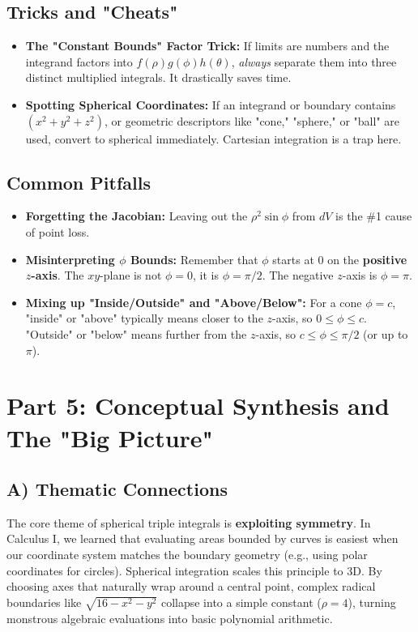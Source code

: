 \documentclass[12pt]{article}
\begin{document}
\subsection{Tricks and "Cheats"}
\begin{itemize}
    \item \textbf{The "Constant Bounds" Factor Trick:} If limits are numbers and the integrand factors into $f(\rho)g(\phi)h(\theta)$, \textit{always} separate them into three distinct multiplied integrals. It drastically saves time.
    \item \textbf{Spotting Spherical Coordinates:} If an integrand or boundary contains $(x^2+y^2+z^2)$, or geometric descriptors like "cone," "sphere," or "ball" are used, convert to spherical immediately. Cartesian integration is a trap here.
\end{itemize}

\subsection{Common Pitfalls}
\begin{itemize}
    \item \textbf{Forgetting the Jacobian:} Leaving out the $\rho^2 \sin\phi$ from $dV$ is the \#1 cause of point loss.
    \item \textbf{Misinterpreting $\phi$ Bounds:} Remember that $\phi$ starts at $0$ on the \textbf{positive $z$-axis}. The $xy$-plane is not $\phi=0$, it is $\phi=\pi/2$. The negative $z$-axis is $\phi=\pi$.
    \item \textbf{Mixing up "Inside/Outside" and "Above/Below":} For a cone $\phi=c$, "inside" or "above" typically means closer to the $z$-axis, so $0 \le \phi \le c$. "Outside" or "below" means further from the $z$-axis, so $c \le \phi \le \pi/2$ (or up to $\pi$).
\end{itemize}

\newpage
\section{Part 5: Conceptual Synthesis and The "Big Picture"}

\subsection{A) Thematic Connections}
The core theme of spherical triple integrals is \textbf{exploiting symmetry}. In Calculus I, we learned that evaluating areas bounded by curves is easiest when our coordinate system matches the boundary geometry (e.g., using polar coordinates for circles). Spherical integration scales this principle to 3D. By choosing axes that naturally wrap around a central point, complex radical boundaries like $\sqrt{16-x^2-y^2}$ collapse into a simple constant ($\rho=4$), turning monstrous algebraic evaluations into basic polynomial arithmetic.
\end{document}
